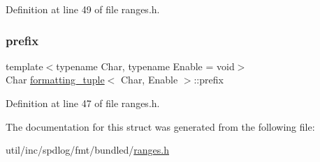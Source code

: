 Definition at line 49 of file ranges.\+h.

\mbox{\label{structformatting__tuple_a0782dad994369d31b822bcd23456dcd6}} 
\subsubsection{\texorpdfstring{prefix}{prefix}}
{\footnotesize\ttfamily template$<$typename Char, typename Enable = void$>$ \\
Char \hyperlink{structformatting__tuple}{formatting\+\_\+tuple}$<$ Char, Enable $>$\+::prefix}



Definition at line 47 of file ranges.\+h.



The documentation for this struct was generated from the following file\+:\begin{DoxyCompactItemize}
\item 
util/inc/spdlog/fmt/bundled/\hyperlink{ranges_8h}{ranges.\+h}\end{DoxyCompactItemize}
